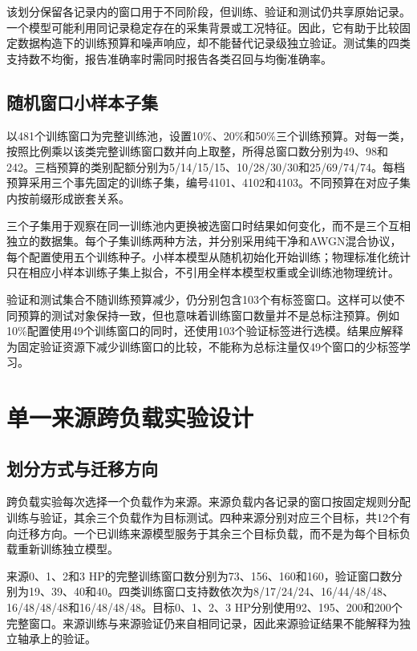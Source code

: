 \documentclass[UTF8,12pt,openany,twoside]{ctexbook}
\numberwithin{equation}{chapter}
\begin{document}
该划分保留各记录内的窗口用于不同阶段，但训练、验证和测试仍共享原始记录。一个模型可能利用同记录稳定存在的采集背景或工况特征。因此，它有助于比较固定数据构造下的训练预算和噪声响应，却不能替代记录级独立验证。测试集的四类支持数不均衡，报告准确率时需同时报告各类召回与均衡准确率。

\subsection{随机窗口小样本子集}\label{ux968fux673aux7a97ux53e3ux5c0fux6837ux672cux5b50ux96c6}

以481个训练窗口为完整训练池，设置10\%、20\%和50\%三个训练预算。对每一类，按照比例乘以该类完整训练窗口数并向上取整，所得总窗口数分别为49、98和242。三档预算的类别配额分别为5/14/15/15、10/28/30/30和25/69/74/74。每档预算采用三个事先固定的训练子集，编号4101、4102和4103。不同预算在对应子集内按前缀形成嵌套关系。

三个子集用于观察在同一训练池内更换被选窗口时结果如何变化，而不是三个互相独立的数据集。每个子集训练两种方法，并分别采用纯干净和AWGN混合协议，每个配置使用五个训练种子。小样本模型从随机初始化开始训练；物理标准化统计只在相应小样本训练子集上拟合，不引用全样本模型权重或全训练池物理统计。

验证和测试集合不随训练预算减少，仍分别包含103个有标签窗口。这样可以使不同预算的测试对象保持一致，但也意味着训练窗口数量并不是总标注预算。例如10\%配置使用49个训练窗口的同时，还使用103个验证标签进行选模。结果应解释为固定验证资源下减少训练窗口的比较，不能称为总标注量仅49个窗口的少标签学习。

\section{单一来源跨负载实验设计}\label{ux5355ux4e00ux6765ux6e90ux8de8ux8d1fux8f7dux5b9eux9a8cux8bbeux8ba1}

\subsection{划分方式与迁移方向}\label{ux5212ux5206ux65b9ux5f0fux4e0eux8fc1ux79fbux65b9ux5411}

跨负载实验每次选择一个负载作为来源。来源负载内各记录的窗口按固定规则分配训练与验证，其余三个负载作为目标测试。四种来源分别对应三个目标，共12个有向迁移方向。一个已训练来源模型服务于其余三个目标负载，而不是为每个目标负载重新训练独立模型。

来源0、1、2和3 HP的完整训练窗口数分别为73、156、160和160，验证窗口数分别为19、39、40和40。四类训练窗口支持数依次为8/17/24/24、16/44/48/48、16/48/48/48和16/48/48/48。目标0、1、2、3 HP分别使用92、195、200和200个完整窗口。来源训练与来源验证仍来自相同记录，因此来源验证结果不能解释为独立轴承上的验证。
\end{document}
